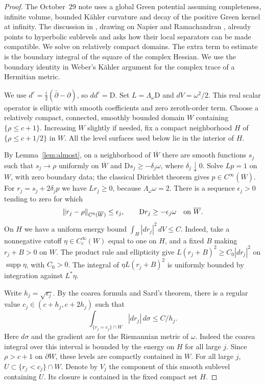 \documentclass[11pt]{amsart}
\theoremstyle{remark}
\numberwithin{equation}{section}
\newcommand{\D}{\mathrm{D}}
\DeclareMathOperator{\supp}{supp}
\begin{document}
\begin{proof}
The October~29 note \cite[Theorem~9.1 and Corollary~9.5]{Oct}
uses a global Green potential assuming completeness, infinite volume,
bounded K\"ahler curvature and decay of the positive Green kernel at
infinity. The discussion in \cite[\S9]{Oct}, drawing on Napier and
Ramachandran \cite[proof of Theorem~2.5]{NR}, already points to
hyperbolic sublevels and asks how their local separators can be made
compatible. We solve on relatively compact domains. The extra term to
estimate is the boundary integral of the square of the complex Hessian.
We use the boundary identity in Weber's K\"ahler argument
\cite[Lemmas~2.1--2.2]{Weber} for the complex trace of a Hermitian metric.

We use $d^c=\tfrac{i}{2}(\bar\partial-\partial)$, so
$dd^c=\D$. Set $L=\Lambda_\omega\D$ and $dV=\omega^2/2$.
This real scalar operator is elliptic with smooth coefficients and
zero zeroth-order term. Choose a relatively compact, connected,
smoothly bounded domain $W$ containing $\{\rho\le c+1\}$.
Increasing $W$ slightly if needed, fix a compact neighborhood $H$
of $\{\rho\le c+1/2\}$ in $W$. All the level surfaces used below
lie in the interior of $H$.

By Lemma~\ref{lem:almost}, on a neighborhood of $\overline W$ there
are smooth functions $s_j$ such that $s_j\to\rho$ uniformly on
$\overline W$ and $\D s_j\ge-\delta_j\omega$, where
$\delta_j\downarrow0$. Solve $Lp=1$ on $W$, with zero boundary
data; the classical Dirichlet theorem gives
$p\in C^\infty(\overline W)$. For $r_j=s_j+2\delta_jp$ we have
$Lr_j\ge0$, because $\Lambda_\omega\omega=2$. There is a sequence
$\epsilon_j>0$ tending to zero for which
\[
 \|r_j-\rho\|_{C^0(\overline W)}\le\epsilon_j,\qquad
 \D r_j\ge-\epsilon_j\omega\quad\hbox{on }\overline W.
\]
On $H$ we have a uniform energy bound
$\int_H |dr_j|^2\,dV\le C$. Indeed, take a nonnegative cutoff
$\eta\in C_c^\infty(W)$ equal to one on $H$, and a fixed $B$ making
$r_j+B>0$ on $W$. The product rule and ellipticity give
$L(r_j+B)^2\ge C_0|dr_j|^2$ on $\supp\eta$, with $C_0>0$.
The integral of $\eta L(r_j+B)^2$ is uniformly bounded by integration
against $L^*\eta$.

Write $h_j=\sqrt{\epsilon_j}$. By the coarea formula and Sard's
theorem, there is a regular value $c_j\in(c+h_j,c+2h_j)$ such that
\begin{equation}\label{eq:dirichlet-flux}
 \int_{\{r_j=c_j\}\cap W}|dr_j|\,d\sigma\le C/h_j .
\end{equation}
Here $d\sigma$ and the gradient are for the Riemannian metric of
$\omega$. Indeed the coarea integral over this interval is bounded
by the energy on $H$ for all large $j$. Since $\rho>c+1$ on
$\partial W$, these levels are compactly contained in $W$.
For all large $j$, $U\subset\{r_j<c_j\}\cap W$. Denote by $V_j$
the component of this smooth sublevel containing $U$. Its closure
is contained in the fixed compact set $H$.


\end{proof}
\end{document}
